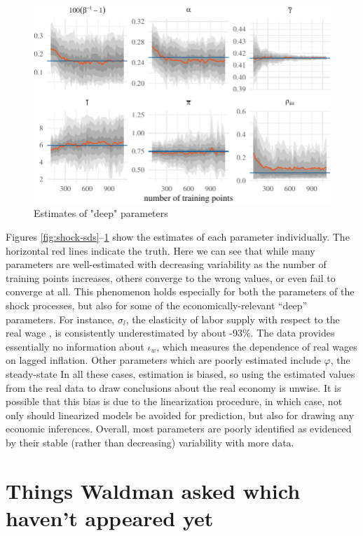 \documentclass[11pt]{article}
\begin{document}
\begin{figure}[t]

{\centering \includegraphics{gfx/deep3-1} 

}

\caption{Estimates of "deep" parameters}\label{fig:deep3}
\end{figure}

Figures \ref{fig:shock-sds}--\ref{fig:deep3} show the estimates of each
parameter individually. The horizontal red lines indicate the truth.
Here we can see that while many parameters are well-estimated with
decreasing variability as the number of training points increases,
others converge to the wrong values, or even fail to converge at all.
This phenomenon holds especially for both the parameters of the shock
processes, but also for some of the economically-relevant ``deep''
parameters. For instance, \(\sigma_l\), the elasticity of labor supply
with respect to the real wage , is consistently underestimated by about
-93\%. The data provides essentially no information about \(\iota_w\),
which measures the dependence of real wages on lagged inflation. Other
parameters which are poorly estimated include \(\varphi\), the
steady-state In all these cases, estimation is biased, so using the
estimated values from the real data to draw conclusions about the real
economy is unwise. It is possible that this bias is due to the
linearization procedure, in which case, not only should linearized
models be avoided for prediction, but also for drawing any economic
inferences. Overall, most parameters are poorly identified as evidenced
by their stable (rather than decreasing) variability with more data.

\hypertarget{things-waldman-asked-which-havent-appeared-yet}{%
\section{Things Waldman asked which haven't appeared
yet}\label{things-waldman-asked-which-havent-appeared-yet}}
\end{document}
